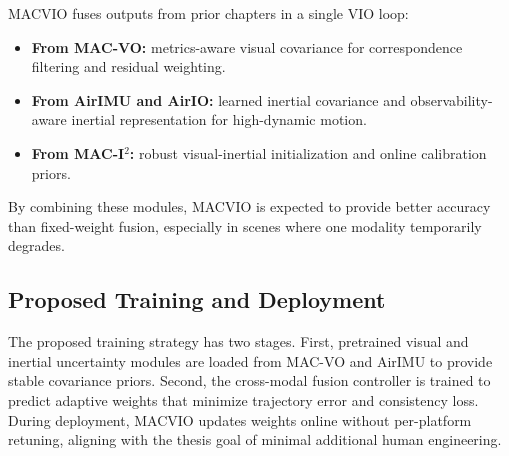 MACVIO fuses outputs from prior chapters in a single VIO loop:
\begin{itemize}
    \item \textbf{From MAC-VO:} metrics-aware visual covariance for correspondence filtering and residual weighting.
    \item \textbf{From AirIMU and AirIO:} learned inertial covariance and observability-aware inertial representation for high-dynamic motion.
    \item \textbf{From MAC-I$^2$:} robust visual-inertial initialization and online calibration priors.
\end{itemize}
By combining these modules, MACVIO is expected to provide better accuracy than fixed-weight fusion, especially in scenes where one modality temporarily degrades.

\subsection{Proposed Training and Deployment}

The proposed training strategy has two stages.
First, pretrained visual and inertial uncertainty modules are loaded from MAC-VO and AirIMU to provide stable covariance priors.
Second, the cross-modal fusion controller is trained to predict adaptive weights that minimize trajectory error and consistency loss.
During deployment, MACVIO updates weights online without per-platform retuning, aligning with the thesis goal of minimal additional human engineering.
